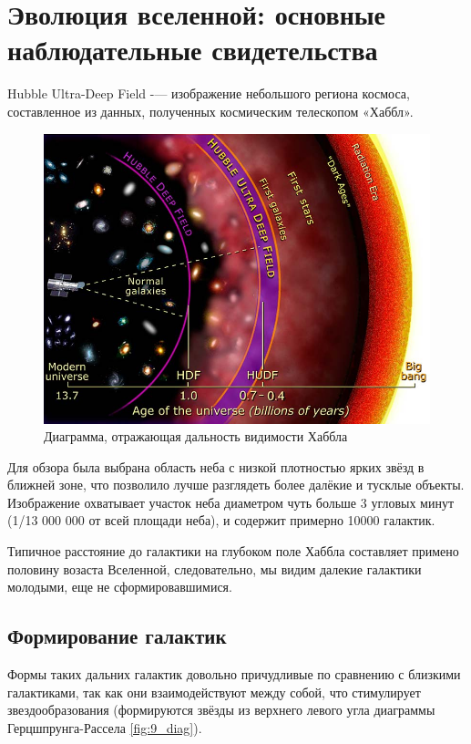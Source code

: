 \section{Эволюция вселенной: основные наблюдательные свидетельства}

Hubble Ultra-Deep Field -— изображение небольшого региона космоса, составленное из данных, полученных космическим телескопом «Хаббл».


\begin{figure}
  \centering
    \includegraphics[width=\linewidth]{Pictures/19_hubble.jpg}
  \caption{Диаграмма, отражающая дальность видимости Хаббла}
  \label{fig:19_hubble}
 \end{figure}
Для обзора была выбрана область неба с низкой плотностью ярких звёзд в ближней зоне, что позволило лучше разглядеть более далёкие и тусклые объекты. Изображение охватывает участок неба диаметром чуть больше 3 угловых минут (1/13 000 000 от всей площади неба), и содержит примерно 10000 галактик.

Типичное расстояние до галактики на глубоком поле Хаббла составляет примено половину возаста Вселенной, следовательно, мы видим далекие галактики молодыми, еще не сформировавшимися.

\subsection{Формирование галактик}

Формы таких дальних галактик довольно причудливые по сравнению с близкими галактиками, так как они взаимодействуют между собой, что стимулирует звездообразования (формируются звёзды из верхнего левого угла диаграммы Герцшпрунга-Рассела \ref{fig:9_diag}).

